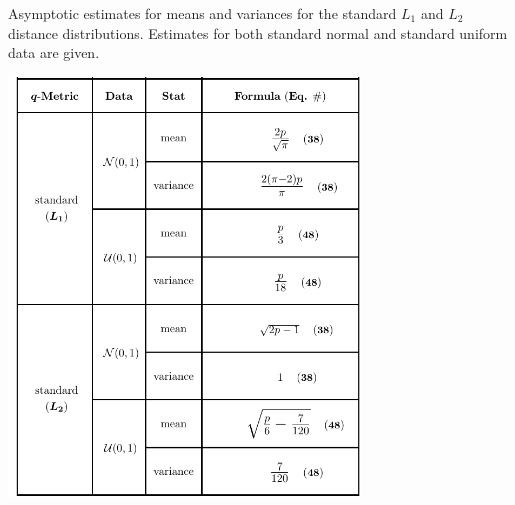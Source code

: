 \documentclass[10pt,letterpaper]{article}\usepackage[]{graphicx}\usepackage[]{color}
\begin{document}
\begin{table}[H]
	\caption{Asymptotic estimates for means and variances for the standard $L_1$ and $L_2$ distance distributions. Estimates for both standard normal and standard uniform data are given.}
	\label{tab:dist_distr_standardL1L2}
	\centering
	\includegraphics[clip,trim=0.27cm 0.0cm 0.0cm 0.05cm,width=0.7\textwidth]{updated_typical_metrics_table.pdf}
\end{table}
\end{document}
